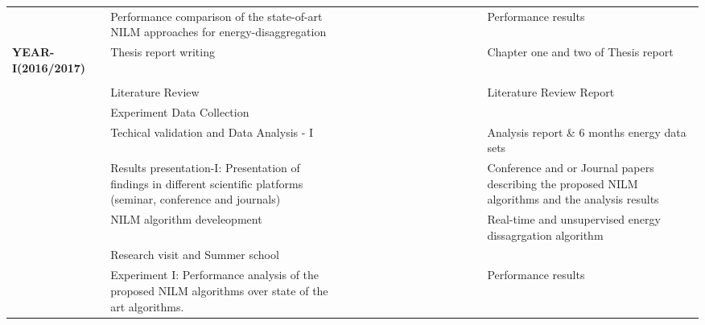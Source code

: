 \begin{landscape}
\begin{table}
{\begin{tabular}{|p{4cm}|p{9cm}|l|l|l|l|l|l|l|l|l|l|l|l|p{7cm}|}
 & Performance comparison of the state-of-art NILM approaches for energy-disaggregation &  &  &  &  &  &  &  &  &\cellcolor[HTML]{000000}  & \cellcolor[HTML]{000000}  & \cellcolor[HTML]{000000} & \cellcolor[HTML]{000000} & Performance results \\ \cline{2-15}
\multirow{-5}{*}{\textbf{YEAR-I(2016/2017)}} & Thesis report writing &  &  &  &  &  &  &  &  &  & \cellcolor[HTML]{000000} & \cellcolor[HTML]{000000} & \cellcolor[HTML]{000000} & Chapter one and two of Thesis report \\ \hline
\rowcolor[HTML]{000000} 
 &  &  &  &  &  &  &  &  &  &  &  &  &  &  \\ \hline
 & Literature Review & \cellcolor[HTML]{000000} & \cellcolor[HTML]{000000} & \cellcolor[HTML]{000000} & \cellcolor[HTML]{000000} & \cellcolor[HTML]{000000} & \cellcolor[HTML]{000000} & \cellcolor[HTML]{000000} & \cellcolor[HTML]{000000} & \cellcolor[HTML]{000000} & \cellcolor[HTML]{000000} & \cellcolor[HTML]{000000} &  & Literature Review Report \\ \cline{2-15} 
 &  Experiment Data Collection & \cellcolor[HTML]{000000}  &\cellcolor[HTML]{000000}   & \cellcolor[HTML]{000000}  & \cellcolor[HTML]{000000}  & \cellcolor[HTML]{000000}  & \cellcolor[HTML]{000000}  & \cellcolor[HTML]{000000}  & \cellcolor[HTML]{000000}  & \cellcolor[HTML]{000000}  &  &  & &  \\ \cline{2-15} 
 & Techical validation and Data Analysis - I  &  &  &\cellcolor[HTML]{000000}  &  &  &  &  &  &  &  &  &  &  Analysis report \& 6 months energy data sets\\ \cline{2-15} 
 & Results presentation-I: Presentation of findings in different scientific platforms (seminar, conference and journals) &  &  &  & \cellcolor[HTML]{000000} &  &  &  &  &  &  &  &  & Conference and or Journal papers describing the proposed NILM algorithms and the analysis results \\ \cline{2-15} 
 & NILM algorithm develeopment &  &  & \cellcolor[HTML]{000000} & \cellcolor[HTML]{000000} & \cellcolor[HTML]{000000} & \cellcolor[HTML]{000000} & \cellcolor[HTML]{000000} & \cellcolor[HTML]{000000} & \cellcolor[HTML]{000000} & \cellcolor[HTML]{000000} &  &  & Real-time and unsupervised energy dissagrgation algorithm \\ \cline{2-15} 
 & Research visit and Summer school &  &  &  &  & \cellcolor[HTML]{000000} & \cellcolor[HTML]{000000} & \cellcolor[HTML]{000000} & &  &  & & &\\ \cline{2-15}
 & Experiment I: Performance analysis of the proposed NILM algorithms over state of the art algorithms. &  &  &  &  &  &  &  &  &  &  & \cellcolor[HTML]{000000} & \cellcolor[HTML]{000000} & Performance results \\ \cline{2-15}

\end{tabular}}
\end{table}
\end{landscape}
